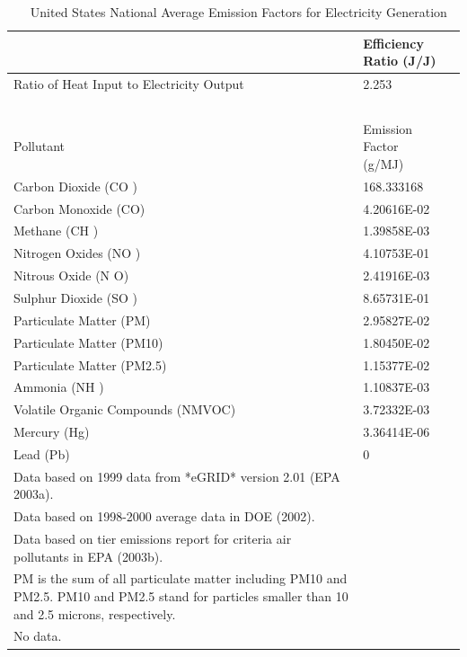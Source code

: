 \begin{longtable}[c]{p{4.5in}p{1.5in}}
\caption{  United States National Average Emission Factors for Electricity Generation \protect \label{table:united-states-national-average-emission}}\\
\toprule 
~ & Efficiency Ratio (J/J) \tabularnewline \midrule
\endhead
Ratio of Heat Input to Electricity Output & 2.253 \tabularnewline
~ & ~ \tabularnewline
Pollutant & Emission Factor~~ (g/MJ) \tabularnewline
Carbon Dioxide (CO  ) & 168.333168 \tabularnewline
Carbon Monoxide (CO) & 4.20616E-02 \tabularnewline
Methane (CH  ) & 1.39858E-03 \tabularnewline
Nitrogen Oxides (NO  ) & 4.10753E-01 \tabularnewline
Nitrous Oxide (N  O) & 2.41916E-03 \tabularnewline
Sulphur Dioxide (SO  ) & 8.65731E-01 \tabularnewline
Particulate Matter (PM) & 2.95827E-02 \tabularnewline
Particulate Matter (PM10) & 1.80450E-02 \tabularnewline
Particulate Matter (PM2.5) & 1.15377E-02 \tabularnewline
Ammonia (NH  ) & 1.10837E-03 \tabularnewline
Volatile Organic Compounds (NMVOC) & 3.72332E-03 \tabularnewline
Mercury (Hg) & 3.36414E-06 \tabularnewline
Lead (Pb) & 0 \tabularnewline
Data based on 1999 data from *eGRID* version 2.01 (EPA 2003a). \tabularnewline
Data based on 1998-2000 average data in DOE (2002). \tabularnewline
Data based on tier emissions report for criteria air pollutants in EPA (2003b). \tabularnewline
PM is the sum of all particulate matter including PM10 and PM2.5. PM10 and PM2.5 stand for particles smaller than 10 and 2.5 microns, respectively. \tabularnewline
No data. \tabularnewline
\bottomrule
\end{longtable}

